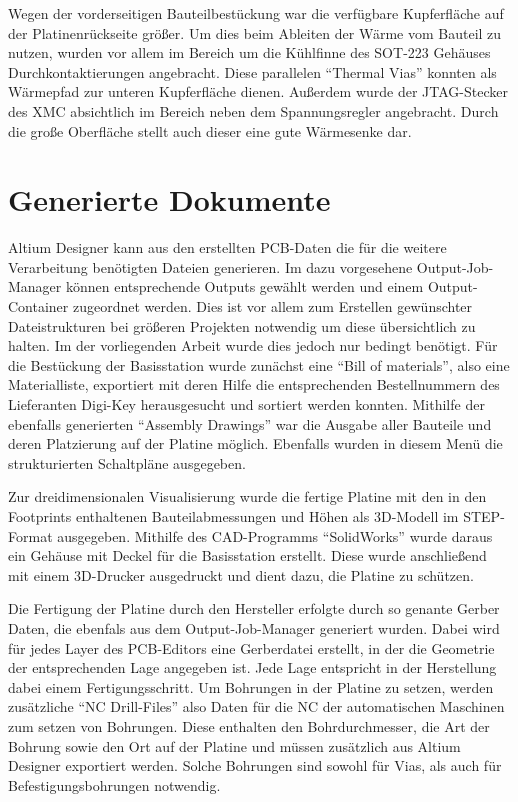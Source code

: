 Wegen der vorderseitigen Bauteilbestückung war die verfügbare Kupferfläche auf der Platinenrückseite  größer. Um dies beim Ableiten der Wärme vom Bauteil zu nutzen, wurden vor allem im Bereich um die Kühlfinne des \ac{SOT}-223 Gehäuses Durchkontaktierungen angebracht. Diese parallelen \enquote{Thermal Vias} konnten als Wärmepfad zur unteren Kupferfläche dienen. Außerdem wurde der \ac{JTAG}-Stecker des XMC absichtlich im Bereich neben dem Spannungsregler angebracht. Durch die große Oberfläche stellt auch dieser eine gute Wärmesenke dar. %

\section{Generierte Dokumente}
Altium Designer kann aus den erstellten \ac{PCB}-Daten die für die weitere Verarbeitung benötigten Dateien generieren. Im dazu vorgesehene Output-Job-Manager können entsprechende Outputs gewählt werden und einem Output-Container zugeordnet werden. Dies ist vor allem zum Erstellen gewünschter Dateistrukturen bei größeren Projekten notwendig um diese übersichtlich zu halten. Im der vorliegenden Arbeit wurde dies jedoch nur bedingt benötigt.
Für die Bestückung der Basisstation wurde zunächst eine \enquote{Bill of materials}, also eine Materialliste, exportiert mit deren Hilfe die entsprechenden Bestellnummern des Lieferanten Digi-Key herausgesucht und sortiert werden konnten. Mithilfe der ebenfalls generierten \enquote{Assembly Drawings} war die Ausgabe aller Bauteile und deren Platzierung auf der Platine möglich. Ebenfalls wurden in diesem Menü die strukturierten Schaltpläne ausgegeben.

Zur dreidimensionalen Visualisierung wurde die fertige Platine mit den in den Footprints enthaltenen Bauteilabmessungen und Höhen als 3D-Modell im \ac{STEP}-Format ausgegeben. Mithilfe des \ac{CAD}-Programms \enquote{SolidWorks} wurde daraus ein Gehäuse mit Deckel für die Basisstation erstellt. Diese wurde anschließend mit einem 3D-Drucker ausgedruckt und dient dazu, die Platine zu schützen.

Die Fertigung der Platine durch den Hersteller erfolgte durch so genante Gerber Daten, die ebenfals aus dem Output-Job-Manager generiert wurden. Dabei wird für jedes Layer des \ac{PCB}-Editors eine Gerberdatei erstellt, in der die Geometrie der entsprechenden Lage angegeben ist. Jede Lage entspricht in der Herstellung dabei einem Fertigungsschritt. Um Bohrungen in der Platine zu setzen, werden zusätzliche \enquote{NC Drill-Files} also Daten für die \ac{NC} der automatischen Maschinen zum setzen von Bohrungen. Diese enthalten den Bohrdurchmesser, die Art der Bohrung sowie den Ort auf der Platine und müssen zusätzlich aus Altium Designer exportiert werden. Solche Bohrungen sind sowohl für Vias, als auch für Befestigungsbohrungen notwendig.


